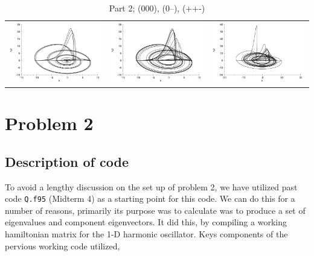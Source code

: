 \documentclass[12pt,letterpaper,notitlepage]{article}
\begin{document}
\begin{landscape}
\thispagestyle{empty}
\begin{table}
\caption{Part 2; (000), (0--), (++-)}
\hspace{-.75in}
  \begin{tabular}{ccc} 
      \parbox[c]{1em}{\includegraphics[width=3in]{zerofull.png}} &
      \hspace{2.5in}       
      \parbox[c]{1em}{\includegraphics[width=3in]{negfull}} &
      \hspace{2.5in}
        \parbox[c]{1em}{\includegraphics[width=3in]{posfull.png}} \\
 \end{tabular}
\end{table}
\end{landscape}

 
\section{Problem 2}
\subsection{Description of code}
To avoid a lengthy discussion on the set up of problem 2, we have utilized past code {\tt Q.f95} (Midterm 4) as a starting point for this code. We can do this for a number of reasons, primarily its purpose was to calculate was to produce a set of eigenvalues and component eigenvectors. It did this, by compiling a working hamiltonian matrix for the 1-D harmonic oscillator. Keys components of the pervious working code utilized,   
\end{document}
